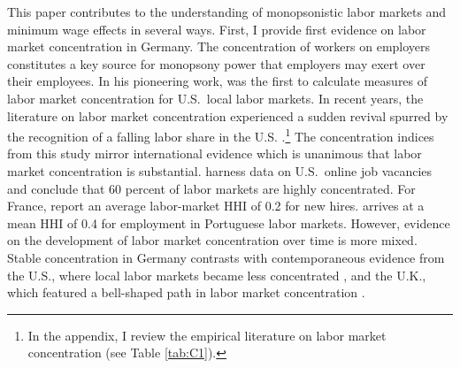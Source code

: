 \documentclass[11pt,oneside,reqno,xcolor=dvipsnames]{article} %
\begin{document}
This paper contributes to the understanding of monopsonistic labor markets and minimum wage effects in several ways. First, I provide first evidence on labor market concentration in Germany. The concentration of workers on employers constitutes a key source for monopsony power that employers may exert over their employees. In his pioneering work, \citet{Bunting1962} was the first to calculate measures of labor market concentration for U.S.\ local labor markets. In recent years, the literature on labor market concentration experienced a sudden revival \citep{AzarEtAl2017} spurred by the recognition of a falling labor share in the U.S. \citep{AutorEtAl2020}.\footnote{In the appendix, I review the empirical literature on labor market concentration (see Table \ref{tab:C1}).} The concentration indices from this study mirror international evidence which is unanimous that labor market concentration is substantial. \citet{AzarEtAl2020} harness data on U.S.\ online job vacancies and conclude that 60 percent of labor markets are highly concentrated. For France, \citet{MarinescuEtAl2021} report an average labor-market HHI of 0.2 for new hires. \citet{Martins2018} arrives at a mean HHI of 0.4 for employment in Portuguese labor markets. However, evidence on the development of labor market concentration over time is more mixed. Stable concentration in Germany contrasts with contemporaneous evidence from the U.S., where local labor markets became less concentrated \citep{Rinz2020}, and the U.K., which featured a bell-shaped path in labor market concentration \citep{AbelEtAl2018}.
\end{document}
